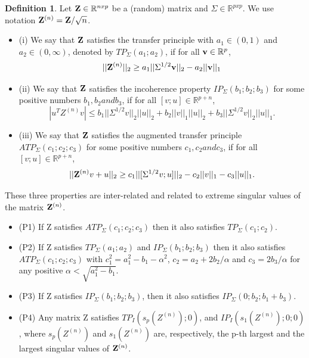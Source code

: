 \documentclass[a4paper,10pt]{article}
\theoremstyle{definition}
\newtheorem{definition}{Definition}
\begin{document}
\begin{definition}
	Let $ \bold{Z} \in \mathbb{R}^{nxp} $ be a (random) matrix and $ \Sigma \in \mathbb{R}^{pxp} $. We use notation $ \bold{Z}^{(n)} = \bold{Z}/\sqrt{n}$.\\
	\begin{itemize}
		\item (i) We say that $\bold{Z}$ satisfies the transfer principle with $a_1 \in (0,1)$ and $a_2 \in (0,\infty)$, denoted by $TP_{\Sigma}(a_1;a_2)$, if for all $\bold{v} \in \mathbb{R}^p$,
		\begin{equation}
			||\bold{Z}^{(n)}||_2 \geq a_1 ||\Sigma^{1/2}\bold{v}||_2 - a_2||\bold{v}||_1
		\end{equation}
		
		\item (ii) We say that $\bold{Z}$ satisfies the incoherence property $IP_{\Sigma}(b_1;b_2;b_3)$ for some positive numbers $b_1, b_2 and b_3$, if for all $[v;u] \in \mathbb{R}^{p+n}$,
		\begin{equation}
			|u^T Z^{(n)}v| \leq b_1||\Sigma^{1/2}v||_2||u||_2 + b_2||v||_1||u||_2 + b_3||\Sigma^{1/2}v||_2||u||_1.
		\end{equation}
		\item (iii) We say that $ \bold{Z} $ satisfies the augmented transfer principle $ATP_{\Sigma}(c_1;c_2;c_3)$ for some positive numbers $c_1, c_2 and c_3$, if for all $[v;u]\in \mathbb{R}^{p+n}$,
		\begin{equation}
			||\bold{Z}^{(n)}v+u||_2 \geq c_1||[\Sigma^{1/2}v;u]||_2 - c_2||v||_1 - c_3||u||_1.
		\end{equation}
	\end{itemize}
	
	These three properties are inter-related and related to extreme singular values of the matrix $\bold{Z}^{(n)}$.
	
	\begin{itemize}
		\item (P1) If Z satisfies $ATP_{\Sigma}(c_1;c_2;c_3)$ then it also satisfies $TP_{\Sigma}(c_1;c_2)$.
		\item (P2) If Z satisfies $TP_{\Sigma}(a_1;a_2)$ and $IP_{\Sigma}(b_1;b_2;b_3)$ then it also satisfies $ATP_{\Sigma}(c_1;c_2;c_3)$ with $c^2_1 = a_1^2 - b_1 - \alpha^2$, $c_2 = a_2 + 2b_2/\alpha$ and $c_3 = 2b_3/\alpha$ for any positive $\alpha < \sqrt{a^2_1 - b_1}$.
		\item (P3) If Z satisfies $IP_{\Sigma}(b_1;b_2;b_3)$, then it also satisfies $IP_{\Sigma}(0;b_2;b_1+b_3)$.
		\item (P4) Any matrix Z satisfies $TP_I(s_p(Z^{(n)});0)$, and $IP_I(s_1(Z^{(n)});0;0)$, where $s_p(Z^{(n)})$ and $s_1(Z^{(n)})$ are, respectively, the p-th largest and the largest singular values of $\bold{Z}^{(n)}$.
	\end{itemize}
	
\end{definition}
\end{document}
